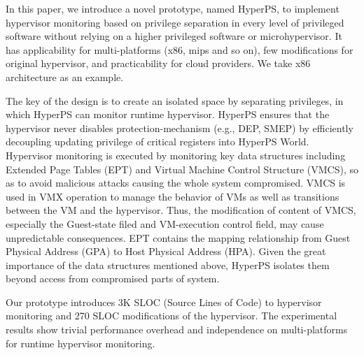 \documentclass[conference]{IEEEtran}
\begin{document}
In this paper, we introduce a novel prototype, named HyperPS, to implement hypervisor monitoring based on privilege separation in every level of privileged software without relying on a higher privileged software or microhypervisor. It has applicability for multi-platforms (x86, mips and so on), few modifications for original hypervisor, and practicability for cloud providers.
We take x86 architecture as an example.

The key of the design is to create an isolated space by separating privileges, in which HyperPS can monitor runtime hypervisor. 
HyperPS ensures that the hypervisor never disables protection-mechanism (e.g., DEP, SMEP) by efficiently decoupling updating privilege of critical registers into HyperPS World.
Hypervisor monitoring is executed by monitoring key data structures including Extended Page Tables (EPT) and Virtual Machine Control Structure (VMCS),
so as to avoid malicious attacks causing the whole system compromised. VMCS is used in VMX operation to manage the behavior of VMs as well as transitions between the VM and the hypervisor. Thus, the modification of content of VMCS, especially the Guest-state filed and VM-execution control field, may cause unpredictable consequences. EPT contains the mapping relationship from Guest Physical Address (GPA) to Host Physical Address (HPA). Given the great importance of the data structures mentioned above, HyperPS isolates them beyond access from compromised parts of system.



Our prototype introduces 3K SLOC (Source Lines of Code) to hypervisor monitoring and 270 SLOC modifications of the hypervisor.
The experimental results show trivial performance overhead and independence on multi-platforms for runtime hypervisor monitoring. 
\end{document}
